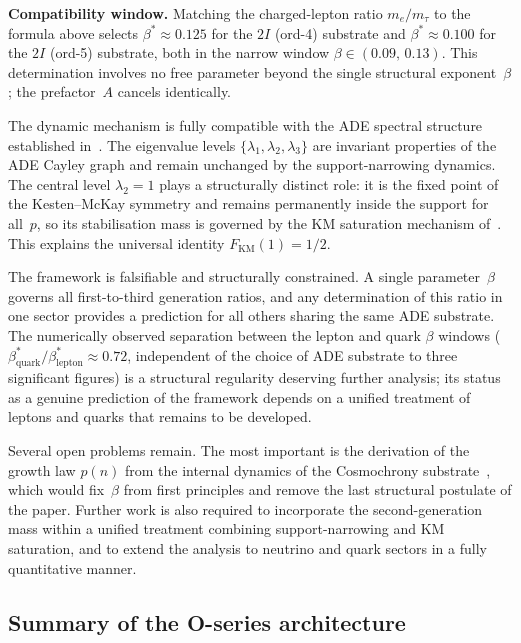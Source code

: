 \documentclass[11pt,a4paper]{article}
\newcommand{\FKM}{F_{\mathrm{KM}}}
\begin{document}
    \medskip
    \noindent
    \textbf{Compatibility window.}
    Matching the charged-lepton ratio $m_e/m_\tau$ to the formula above
    selects $\beta^{*} \approx 0.125$ for the $2I$ (ord-4) substrate and
    $\beta^{*} \approx 0.100$ for the $2I$ (ord-5) substrate,
    both in the narrow window $\beta \in (0.09,\, 0.13)$.
    This determination involves no free parameter beyond the single
    structural exponent~$\beta$; the prefactor~$A$ cancels identically.

    \medskip
    The dynamic mechanism is fully compatible with the ADE spectral structure
    established in~\cite{Beau2026a4}.
    The eigenvalue levels $\{\lambda_1,\lambda_2,\lambda_3\}$ are invariant
    properties of the ADE Cayley graph and remain unchanged by the
    support-narrowing dynamics.
    The central level $\lambda_2 = 1$ plays a structurally distinct role:
    it is the fixed point of the Kesten--McKay symmetry and remains
    permanently inside the support for all~$p$, so its stabilisation
    mass is governed by the KM saturation mechanism of~\cite{Beau2026a5}.
    This explains the universal identity $\FKM(1) = 1/2$.

    The framework is falsifiable and structurally constrained.
    A single parameter~$\beta$ governs all first-to-third generation ratios,
    and any determination of this ratio in one sector provides a prediction
    for all others sharing the same ADE substrate.
    The numerically observed separation between the lepton and quark
    $\beta$ windows ($\beta^{*}_{\mathrm{quark}}/\beta^{*}_{\mathrm{lepton}}
  \approx 0.72$, independent of the choice of ADE substrate to three
    significant figures) is a structural regularity deserving further analysis;
    its status as a genuine prediction of the framework depends on a unified
    treatment of leptons and quarks that remains to be developed.

    Several open problems remain.
    The most important is the derivation of the growth law $p(n)$ from
    the internal dynamics of the Cosmochrony substrate~\cite{Cosmochrony},
    which would fix~$\beta$ from first principles and remove the last
    structural postulate of the paper.
    Further work is also required to incorporate the second-generation mass
    within a unified treatment combining support-narrowing and KM saturation,
    and to extend the analysis to neutrino and quark sectors in a fully
    quantitative manner.

    \subsection{Summary of the O-series architecture}
      \label{subsec:O-series}
\end{document}
